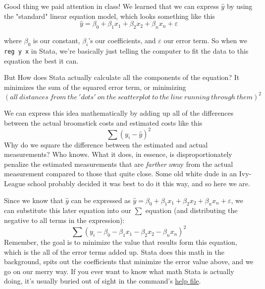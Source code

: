 \documentclass{article}                 %
\begin{document}
	Good thing we paid attention in class! We learned that we can express $\hat{y}$ by using the "standard" linear equation model, which looks something like this $$\hat{y} = \beta_0 + \beta_{1}x_1 + \beta_{2}x_2 + \beta_{n}x_n + \varepsilon$$

	where $\beta_0$ is our constant, $\beta_i$'s our coefficients, and $\varepsilon$ our error term. So when we \texttt{reg y x} in Stata, we're basically just telling the computer to fit the data to this equation the best it can.

	But How does Stata actually calculate all the components of the equation? It minimizes the sum of the squared error term, or minimizing $$(all\:distances \:from \:the \:'dots' \:on \:the \:scatterplot \:to \:the \:line \:running \:through \:them)^2$$

	We can express this idea mathematically by adding up all of the differences between the actual broomstick costs and estimated costs like this $$\sum(y_i - \hat{y})^2  $$ Why do we square the difference between the estimated and actual measurements? Who knows. What it does, in essence, is disproportionately penalize the estimated measurements that are \textit{farther} away from the actual measurement compared to those that quite close. Some old white dude in an Ivy-League school probably decided it was best to do it this way, and so here we are.

	Since we know that $\hat{y}$ can be expressed as $\hat{y} = \beta_0 + \beta_{1}x_1 + \beta_{2}x_2 + \beta_{n}x_n + \varepsilon$, we can substitute this later equation into our $\sum$ equation (and distributing the negative to all terms in the expression): $$\sum(y_i - \beta_0 - \beta_{1}x_1 - \beta_{2}x_2 - \beta_{n}x_n )^2  $$
	Remember, the goal is to minimize the value that results form this equation, which is the all of the error terms added up. Stata does this math in the background, spits out the coefficients that minimize the error value above, and we go on our merry way. If you ever want to know what math Stata is actually doing, it's usually buried out of sight in the command's \href{https://www.stata.com/manuals13/rregress.pdf}{help file}.
\end{document}
